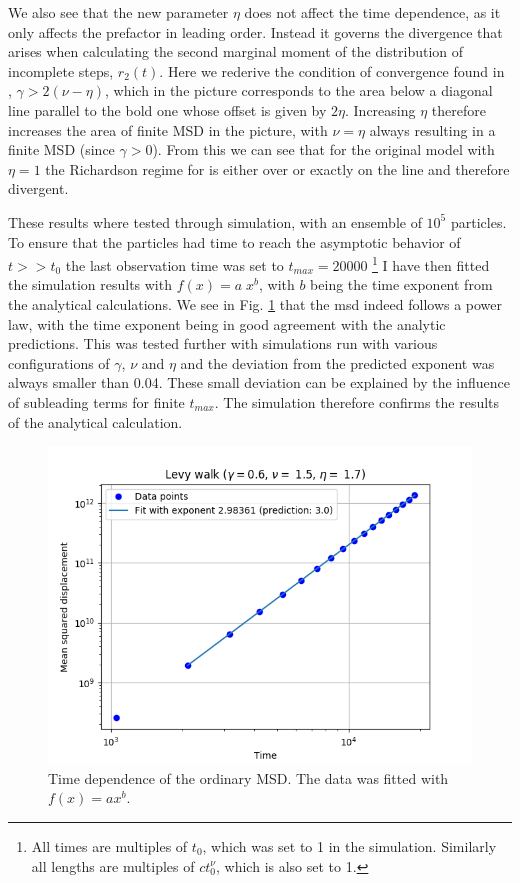 We also see that the new parameter $\eta$ does not affect the time dependence, as it only affects the prefactor in leading order. Instead it governs the divergence that arises when calculating the second marginal moment of the distribution of incomplete steps, $r_2(t)$. Here we rederive the condition of convergence found in \cite{radons2018}, $\gamma > 2(\nu - \eta)$, which in the picture corresponds to the area below a diagonal line parallel to the bold one whose offset is given by $2\eta$. Increasing $\eta$ therefore increases the area of finite MSD in the picture, with $\nu=\eta$ always resulting in a finite MSD (since $\gamma >0$). From this we can see that for the original model with $\eta =1$ the Richardson regime for is either over or exactly on the line and therefore divergent. 

These results where tested through simulation, with an ensemble of $10^5$ particles. To ensure that the particles had time to reach the asymptotic behavior of $t>>t_0$ the last observation time was set to $t_{max} = 20000$
\footnote{All times are multiples of $t_0$, which was set to 1 in the simulation. Similarly all lengths are multiples of $c t_0^{\nu}$, which is also set to 1. }
I have then fitted the simulation results with $f(x) = a \; x^b$, with $b$ being the time exponent from the analytical calculations. We see in Fig. \ref{fig:plotMSDordinary} that the \gls{msd} indeed follows a power law, with the time exponent being in good agreement with the analytic predictions. This was tested further with simulations run with various configurations of $\gamma$, $\nu$ and $\eta$ and the  deviation from the predicted exponent was always smaller than 0.04. These small deviation can be explained by the influence of subleading terms for finite $t_{max}$. The simulation therefore confirms the results of the analytical calculation.
%
\begin{figure}
\begin{center}
\includegraphics[width=120mm]{pics/plotMSDordinary.png}
\caption{Time dependence of the ordinary MSD. The data was fitted with $f(x) = ax^b$.
\label{fig:plotMSDordinary} }
\end{center}
\end{figure} 
%

